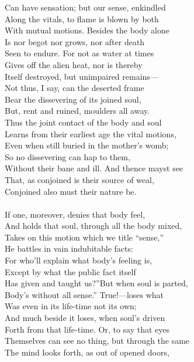 Can have sensation; but our sense, enkindled\\
Along the vitals, to flame is blown by both\\
With mutual motions. Besides the body alone\\
Is nor begot nor grows, nor after death\\
Seen to endure. For not as water at times\\
Gives off the alien heat, nor is thereby\\
Itself destroyed, but unimpaired remains—\\
Not thus, I say, can the deserted frame\\
Bear the dissevering of its joined soul,\\
But, rent and ruined, moulders all away.\\
Thus the joint contact of the body and soul\\
Learns from their earliest age the vital motions,\\
Even when still buried in the mother's womb;\\
So no dissevering can hap to them,\\
Without their bane and ill. And thence mayst see\\
That, as conjoined is their source of weal,\\
Conjoined also must their nature be.\\
\\
If one, moreover, denies that body feel,\\
And holds that soul, through all the body mixed,\\
Takes on this motion which we title ``sense,''\\
He battles in vain indubitable facts:\\
For who'll explain what body's feeling is,\\
Except by what the public fact itself\\
Has given and taught us?''But when soul is parted,\\
Body's without all sense.'' True!—loses what\\
Was even in its life-time not its own;\\
And much beside it loses, when soul's driven\\
Forth from that life-time. Or, to say that eyes\\
Themselves can see no thing, but through the same\\
The mind looks forth, as out of opened doors,\\
